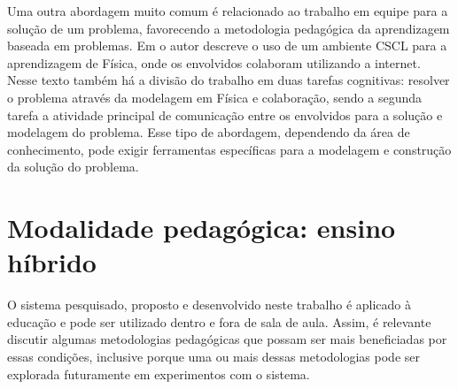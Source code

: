 
Uma outra abordagem muito comum é relacionado ao trabalho em equipe para a solução de um problema, favorecendo a metodologia pedagógica da aprendizagem baseada em problemas. Em  o autor descreve o uso de um ambiente CSCL para a aprendizagem de Física, onde os envolvidos colaboram utilizando a internet. Nesse texto também há a divisão do trabalho em duas tarefas cognitivas: resolver o problema através da modelagem em Física e colaboração, sendo a segunda tarefa a atividade principal de comunicação entre os envolvidos para a solução e modelagem do problema. Esse tipo de abordagem, dependendo da área de conhecimento, pode exigir ferramentas específicas para a modelagem e construção da solução do problema.



\section{Modalidade pedagógica: ensino híbrido}
\label{sec:flipped}


O sistema pesquisado, proposto e desenvolvido neste trabalho é aplicado à educação e pode ser utilizado dentro e fora de sala de aula. Assim, é relevante discutir algumas metodologias pedagógicas que possam ser mais beneficiadas por essas condições, inclusive porque uma ou mais dessas metodologias pode ser explorada futuramente em experimentos com o sistema.

